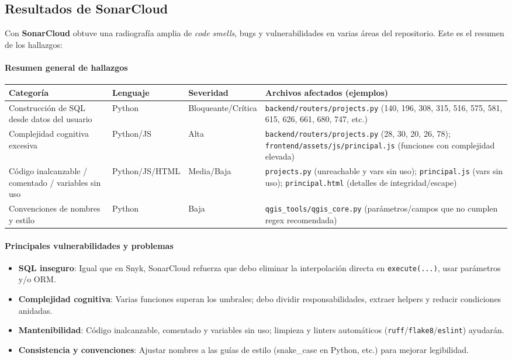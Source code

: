\documentclass[12pt, a4paper]{article}
\begin{document}
\subsection{Resultados de SonarCloud}
Con \textbf{SonarCloud} obtuve una radiografía amplia de \textit{code smells}, bugs y vulnerabilidades en varias áreas del 
repositorio. Este es el resumen de los hallazgos:

\paragraph{Resumen general de hallazgos}
\begin{table}[h!]\footnotesize\centering
\begin{tabularx}{\textwidth}{@{} L{3.9cm} L{2.2cm} L{2.6cm} Y @{}}
\toprule
\textbf{Categoría} & \textbf{Lenguaje} & \textbf{Severidad} & \textbf{Archivos afectados (ejemplos)} \\
\midrule
Construcción de SQL desde datos del usuario & Python & Bloqueante/Crítica & \texttt{backend/routers/projects.py} (140, 196, 308, 315, 516, 575, 581, 615, 626, 661, 680, 747, etc.) \\
Complejidad cognitiva excesiva & Python/JS & Alta & \texttt{backend/routers/projects.py} (28, 30, 20, 26, 78); \texttt{frontend/assets/js/principal.js} (funciones con complejidad elevada) \\
Código inalcanzable / comentado / variables sin uso & Python/JS/HTML & Media/Baja & \texttt{projects.py} (unreachable y vars sin uso); \texttt{principal.js} (vars sin uso); \texttt{principal.html} (detalles de integridad/escape) \\
Convenciones de nombres y estilo & Python & Baja & \texttt{qgis\_tools/qgis\_core.py} (parámetros/campos que no cumplen regex recomendada) \\
\bottomrule
\end{tabularx}
\end{table}

\paragraph{Principales vulnerabilidades y problemas}
\begin{itemize}
  \item \textbf{SQL inseguro}: Igual que en Snyk, SonarCloud refuerza que debo eliminar la interpolación directa 
  en \texttt{execute(...)}, usar parámetros y/o ORM.
  \item \textbf{Complejidad cognitiva}: Varias funciones superan los umbrales; debo dividir responsabilidades, 
  extraer helpers y reducir condiciones anidadas.
  \item \textbf{Mantenibilidad}: Código inalcanzable, comentado y variables sin uso; limpieza y linters automáticos 
  (\texttt{ruff}/\texttt{flake8}/\texttt{eslint}) ayudarán.
  \item \textbf{Consistencia y convenciones}: Ajustar nombres a las guías de estilo (snake\_case en Python, etc.) 
  para mejorar legibilidad.
\end{itemize}
\end{document}
